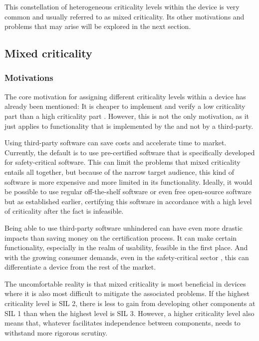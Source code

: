 This constellation of heterogeneous criticality levels within the device is very common and usually referred to as mixed criticality. Its other motivations and problems that may arise will be explored in the next section.
\subsection{Mixed criticality} \label{mixed-criticality}
\subsubsection{Motivations}
The core motivation for assigning different criticality levels within a device has already been mentioned: It is cheaper to implement and verify a low criticality part than a high criticality part \cite{perez2013safety}. However, this is not the only motivation, as it just applies to functionality that is implemented by the \mfg{} and not by a third-party.

Using third-party software can save costs and accelerate time to market. Currently, the default is to use pre-certified software that is specifically developed for safety-critical software. This can limit the problems that mixed criticality entails all together, but because of the narrow target audience, this kind of software is more expensive and more limited in its functionality. Ideally, it would be possible to use regular off-the-shelf software or even free open-source software but as established earlier, certifying this software in accordance with a high level of criticality after the fact is infeasible.

Being able to use third-party software unhindered can have even more drastic impacts than saving money on the certification process. It can make certain functionality, especially in the realm of usability, feasible in the first place. And with the growing consumer demands, even in the safety-critical sector \cite{ITA.May2016}, this can differentiate a device from the rest of the market.

The uncomfortable reality is that mixed criticality is most beneficial in devices where it is also most difficult to mitigate the associated problems. If the highest criticality level is SIL 2, there is less to gain from developing other components at SIL 1 than when the highest level is SIL 3. However, a higher criticality level also means that, whatever facilitates independence between components,  needs to withstand more rigorous scrutiny. 

